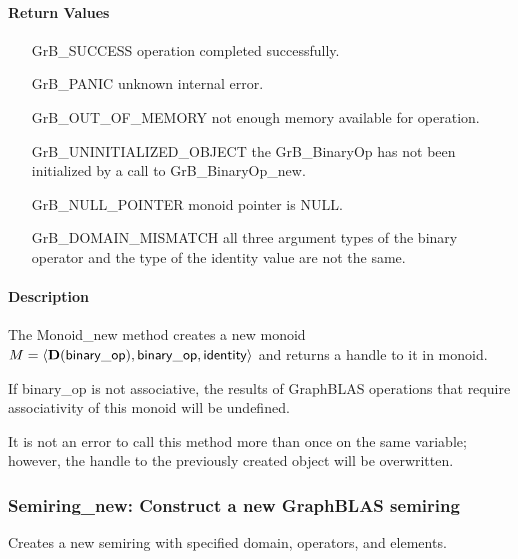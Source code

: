 \paragraph{Return Values}

\begin{itemize}[leftmargin=2.1in]
\item[{\sf GrB\_SUCCESS}]           operation completed successfully.
\item[{\sf GrB\_PANIC}]             unknown internal error.
\item[{\sf GrB\_OUT\_OF\_MEMORY}]   not enough memory available for operation.
\item[{\sf GrB\_UNINITIALIZED\_OBJECT}]  the {\sf GrB\_BinaryOp} has not been
                                    initialized by a call to {\sf GrB\_BinaryOp\_new}.
\item[{\sf GrB\_NULL\_POINTER}]     {\sf monoid} pointer is {\sf NULL}.
\item[{\sf GrB\_DOMAIN\_MISMATCH}]  all three argument types of the binary operator and
                                    the type of the identity value are not the same.
\end{itemize}

\paragraph{Description}

The {\sf Monoid\_new} method creates a new monoid $M = \langle \mathbf{D}({\sf binary\_op}), {\sf binary\_op}, 
{\sf identity} \rangle$ and returns a handle to it in {\sf monoid}.

If {\sf binary\_op} is not associative, the results of GraphBLAS operations that
require associativity of this monoid will be undefined.

It is not an error to call this method more than once on the same variable;  
however, the handle to the previously created object will be overwritten. 

\subsubsection{{\sf Semiring\_new}: Construct a new GraphBLAS semiring}

Creates a new semiring with specified domain, operators, and elements.

\paragraph{\syntax}

